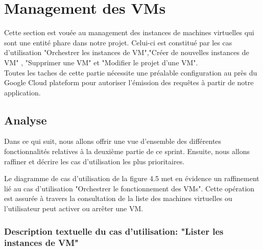 \section{Management des VMs}
Cette section est vouée au management des instances de machines virtuelles qui sont une entité phare dans notre projet. Celui-ci est constitué par les cas d'utilisation "Orchestrer les instances de VM","Créer de nouvelles instances de VM" , "Supprimer une VM" et "Modifier le projet d'une VM".\\
Toutes les taches de cette partie nécessite une préalable configuration au près du Google Cloud plateform pour autoriser l'émission des requêtes à partir de notre application.
\subsection{Analyse}
Dans ce qui suit, nous allons offrir une vue d'ensemble des différentes fonctionnalités
relatives à la deuxième partie de ce sprint. Ensuite, nous allons raffiner et décrire les cas
d'utilisation les plus prioritaires.
	Le diagramme de cas d'utilisation de la figure 4.5 met en évidence un raffinement lié
au cas d'utilisation "Orchestrer le fonctionnement des VMs". Cette opération est assurée à travers la consultation de la liste des machines virtuelles ou l'utilisateur peut  activer ou arrêter une VM.
\subsubsection{Description textuelle du cas d'utilisation: "Lister les instances de VM"}

